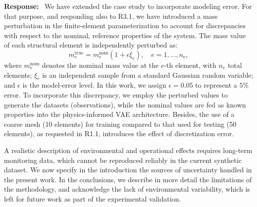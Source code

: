 \documentclass[11pt]{article}
\newenvironment{response}{\par\smallskip\noindent\color{resp}\textbf{Response:}\ }{\par}
\begin{document}
\begin{response}
We have extended the case study to incorporate modeling error.
For that purpose, and responding also to R3.1, we have introduced a mass perturbation in the finite-element parameterization to account for discrepancies with respect to the nominal, reference properties of the system. 
The mass value of each structural element is independently perturbed as: 
\begin{equation}
	m_e^{\text{true}} = m_e^{\text{nom}} \left(1 + \epsilon \xi_e\right), \quad e = 1, \dots, n_{\text{e}},
	\label{eq:modeling_error}
\end{equation}
where $m_e^{\text{nom}}$ denotes the nominal mass value at the $e$-th element, with $n_{e}$ total elements; $\xi_e$ is an independent sample from a standard Gaussian random variable; and $\epsilon$ is the model-error level. 
In this work, we assign $\epsilon = 0.05$ to represent a $5\%$ error. 
To incorporate this discrepancy, we employ the perturbed values to generate the datasets (observations), while the nominal values are fed as known properties into the physics-informed VAE architecture. 
Besides, the use of a coarse mesh (10 elements) for training compared to that used for testing (50 elements), as requested in R1.1, introduces the effect of discretization error.

A realistic description of environmental and operational effects requires long-term monitoring data, which cannot be reproduced reliably in the current synthetic dataset. 
We now specify in the introduction the sources of uncertainty handled in the present work. 
In the conclusions, we describe in more detail the limitations of the methodology, and acknowledge the lack of environmental variability, which is left for future work as part of the experimental validation. 



\end{response}
\end{document}
